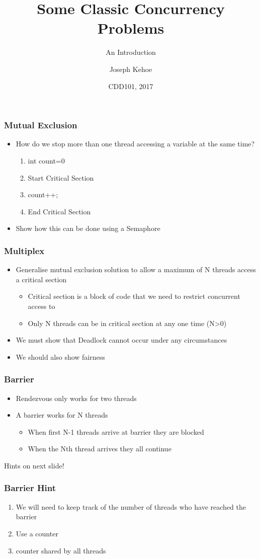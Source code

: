 \documentclass{beamer}
\title[Concurrency] %
{Some Classic Concurrency Problems}
\subtitle{An Introduction}
\author[Dr. Joseph Kehoe] %
{Joseph Kehoe\inst{1}}
\institute[IT Carlow] %
{
	\inst{1}%
	Department of Computing and Networking\\
	Institute of Technology Carlow
}
\date[ITC 2017] %
{CDD101, 2017}
\begin{document}
 
\frame{\titlepage}
 
 

\begin{frame}
\frametitle{Mutual Exclusion}
\begin{itemize}
\item How do we stop more than one thread accessing a variable at the same time?
\begin{enumerate}
\item int count=0
\item Start Critical Section
\item count++;
\item End Critical Section
\end{enumerate}
\item Show how this can be done using a Semaphore
\end{itemize}
\end{frame}


\begin{frame}
\frametitle{Multiplex}
\begin{itemize}
\item Generalise mutual exclusion solution to allow a maximum of N threads access a critical section
	\begin{itemize}
	\item Critical section is a block of code that we need to restrict concurrent access to
 	\item Only N threads can be in critical section at any one time (N>0)
 	\end{itemize} 
 \item We must show that Deadlock cannot occur under any circumstances
 \item We should also show fairness
\end{itemize}
\end{frame}


\begin{frame}
	\frametitle{Barrier}
\begin{itemize}
	\item Rendezvous only works for two threads
	\item A barrier works for N threads
	\begin{itemize}
		\item When first N-1 threads arrive at barrier they are blocked
		\item When the Nth thread arrives they all continue
	\end{itemize}
\end{itemize}
Hints on next slide!
\end{frame}

\begin{frame}
	\frametitle{Barrier Hint}
\begin{enumerate}
\item We will need to keep track of the number of threads who have reached the barrier
\item Use a counter
\item counter shared by all threads	
\end{enumerate}
\end{frame}
\end{document}
